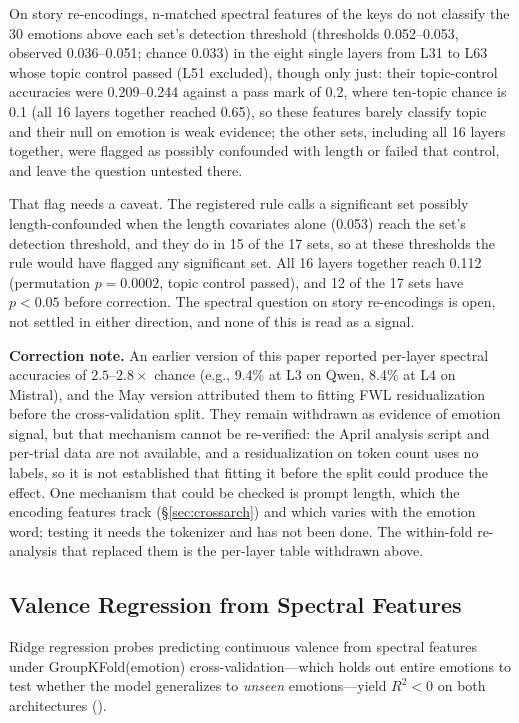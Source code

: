 On story re-encodings, n-matched spectral features of the keys do not classify the 30 emotions above each set's detection threshold (thresholds 0.052--0.053, observed 0.036--0.051; chance 0.033) in the eight single layers from L31 to L63 whose topic control passed (L51 excluded), though only just: their topic-control accuracies were 0.209--0.244 against a pass mark of 0.2, where ten-topic chance is 0.1 (all 16 layers together reached 0.65), so these features barely classify topic and their null on emotion is weak evidence; the other sets, including all 16 layers together, were flagged as possibly confounded with length or failed that control, and leave the question untested there.

That flag needs a caveat. The registered rule calls a significant set possibly length-confounded when the length covariates alone (0.053) reach the set's detection threshold, and they do in 15 of the 17 sets, so at these thresholds the rule would have flagged any significant set. All 16 layers together reach 0.112 (permutation $p = 0.0002$, topic control passed), and 12 of the 17 sets have $p < 0.05$ before correction. The spectral question on story re-encodings is open, not settled in either direction, and none of this is read as a signal.

\textbf{Correction note.} An earlier version of this paper reported per-layer spectral accuracies of $2.5$--$2.8\times$ chance (e.g., 9.4\% at L3 on Qwen, 8.4\% at L4 on Mistral), and the May version attributed them to fitting FWL residualization before the cross-validation split. They remain withdrawn as evidence of emotion signal, but that mechanism cannot be re-verified: the April analysis script and per-trial data are not available, and a residualization on token count uses no labels, so it is not established that fitting it before the split could produce the effect. One mechanism that could be checked is prompt length, which the encoding features track (\S\ref{sec:crossarch}) and which varies with the emotion word; testing it needs the tokenizer and has not been done. The within-fold re-analysis that replaced them is the per-layer table withdrawn above.

\subsection{Valence Regression from Spectral Features}

Ridge regression probes predicting continuous valence from spectral features under GroupKFold(emotion) cross-validation---which holds out entire emotions to test whether the model generalizes to \emph{unseen} emotions---yield $R^2 < 0$ on both architectures ().

